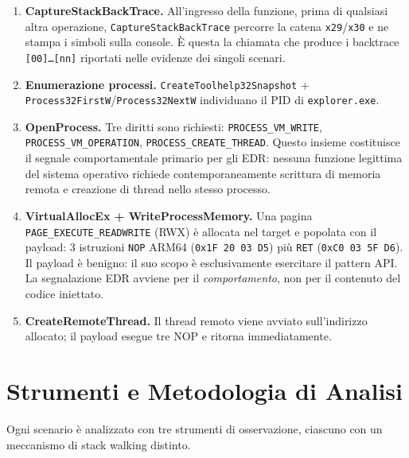 \begin{enumerate}
  \item \textbf{CaptureStackBackTrace.} All'ingresso della funzione, prima
        di qualsiasi altra operazione, \texttt{CaptureStackBackTrace} percorre
        la catena \texttt{x29}/\texttt{x30} e ne stampa i simboli sulla
        console. È questa la chiamata che produce i backtrace
        \texttt{[00]\ldots[nn]} riportati nelle evidenze dei singoli scenari.

  \item \textbf{Enumerazione processi.} \texttt{CreateToolhelp32Snapshot} +
        \texttt{Process32FirstW}/\texttt{Process32NextW} individuano il PID
        di \texttt{explorer.exe}.

  \item \textbf{OpenProcess.} Tre diritti sono richiesti:
        \texttt{PROCESS\_VM\_WRITE}, \texttt{PROCESS\_VM\_OPERATION},
        \texttt{PROCESS\_CREATE\_THREAD}. Questo insieme costituisce il
        segnale comportamentale primario per gli EDR: nessuna funzione
        legittima del sistema operativo richiede
        contemporaneamente scrittura di memoria remota e creazione di thread
        nello stesso processo.

  \item \textbf{VirtualAllocEx + WriteProcessMemory.} Una pagina
        \texttt{PAGE\_EXECUTE\_READWRITE} (RWX) è allocata nel target e
        popolata con il payload: 3 istruzioni \texttt{NOP} ARM64
        (\texttt{0x1F\,20\,03\,D5}) più \texttt{RET} (\texttt{0xC0\,03\,5F\,D6}).
        Il payload è benigno: il suo scopo è esclusivamente esercitare il
        pattern API. La segnalazione EDR avviene per il \emph{comportamento},
        non per il contenuto del codice iniettato.

  \item \textbf{CreateRemoteThread.} Il thread remoto viene avviato
        sull'indirizzo allocato; il payload esegue tre NOP e ritorna
        immediatamente.
\end{enumerate}


\section*{Strumenti e Metodologia di Analisi}
\label{sec:strumenti}

Ogni scenario è analizzato con tre strumenti di osservazione, ciascuno con
un meccanismo di stack walking distinto.

